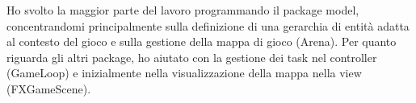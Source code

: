 Ho svolto la maggior parte del lavoro programmando il package model, concentrandomi principalmente sulla definizione di una gerarchia di entità adatta al contesto del gioco e sulla gestione della mappa di gioco (Arena). Per quanto riguarda gli altri package, ho aiutato con la gestione dei task nel controller (GameLoop) e inizialmente nella visualizzazione della mappa nella view (FXGameScene).